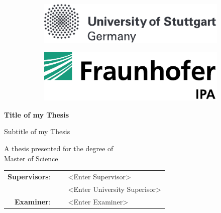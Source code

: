 \begin{titlepage}

	
	\begin{figure}
		\begin{subfigure}{0.5\textwidth}
			\includegraphics[width=1.1\linewidth, left]{resources/logos/university_stuttgart_logo}
		\end{subfigure}
		\begin{subfigure}{0.5\textwidth}
			\includegraphics[width=0.8\linewidth, right]{resources/logos/ipa_logo}
		\end{subfigure}
	\end{figure}
	
	\begin{center}
	
		\vspace*{0.5cm}
		
		\huge
		\textbf{Title of my Thesis}
		
		\vspace{0.25cm}
		
		\Large
		Subtitle of my Thesis
		
		\vspace{1cm}
		
		\textbf{\authorname}
		
		\vspace{1cm}
		
		A thesis presented for the degree of\\
		Master of Science
		
		\vfill
		
		\begingroup
			\begin{tabular}{r l l}
				\textbf{Supervisors}: & \ & <Enter Supervisor>\\
									& \  & <Enter University Superisor>\\[2mm]
				\textbf{Examiner}: & \  & <Enter Examiner>
			\end{tabular}
		

\end{center}
\end{titlepage}
